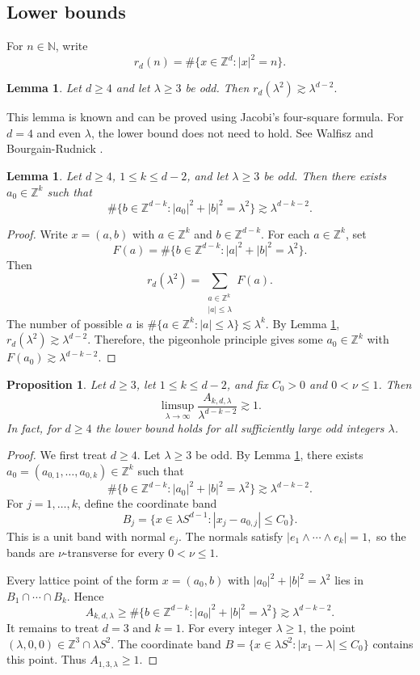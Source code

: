 \documentclass[11pt,reqno]{amsart}
\newtheorem{lemma}[theorem]{Lemma}
\newtheorem{proposition}[theorem]{Proposition}
\numberwithin{equation}{section}
\newcommand{\1}{\textbf{1}}
\newcommand{\ls}{\lesssim}
\newcommand{\gs}{\gtrsim}
\newcommand{\Z}{\mathbb Z}
\newcommand{\N}{\mathbb N}
\newcommand{\la}{\lambda}
\begin{document}
	
	\subsection{Lower bounds}
	For $n\in\N$, write
	\[
	r_d(n)=\#\{x\in\Z^d: |x|^2=n\}.
	\]
	\begin{lemma}\label{lem:rd-odd-lower}
		Let $d\ge4$ and let $\la \ge3$ be odd.  Then $r_d(\la^2)\gs \la^{d-2}.$ 
	\end{lemma}
	This lemma is known and can be proved using Jacobi's four-square formula. For $d=4$ and even $\la$, the lower bound does not need to hold. See Walfisz \cite{w} and Bourgain-Rudnick \cite[Section 2.1]{BR2011}.
	\begin{lemma}\label{lem:slice-pigeonhole}
		Let $d\ge4$, $1\le k\le d-2$, and let $\la\ge3$ be odd.  Then there exists $a_0\in\Z^k$ such that
		\[
		\#\{b\in\Z^{d-k}: |a_0|^2+|b|^2=\la^2\}
		\gs \la^{d-k-2}.
		\]
	\end{lemma}
	
	\begin{proof}
		Write $x=(a,b)$ with $a\in\Z^k$ and $b\in\Z^{d-k}$.  For each $a\in\Z^k$, set
		\[
		F(a)=\#\{b\in\Z^{d-k}: |a|^2+|b|^2=\la^2\}.
		\]
		Then
		\[
		r_d(\la^2)=\sum_{\substack{a\in\Z^k\\ |a|\le \la}}F(a).
		\]
		The number of possible $a$ is $\#\{a\in\Z^k: |a|\le \la\}
		\ls \la^k.$
		By Lemma \ref{lem:rd-odd-lower}, $r_d(\la^2)\gs \la^{d-2}.$
		Therefore, the pigeonhole principle gives some $a_0\in\Z^k$ with $F(a_0)
		\gs
		\la^{d-k-2}.$
	\end{proof}
	
	\begin{proposition}\label{thm:limsup}
		Let $d\ge3$, let $1\le k\le d-2$, and fix $C_0>0$ and $0<\nu\le1$.  Then
		\[
		\limsup_{\lambda\to\infty}
		\frac{A_{k,d,\lambda}}{\lambda^{d-k-2}}
		\gs1.
		\]
		In fact, for $d\ge4$ the lower bound holds for all sufficiently large odd integers $\lambda$.
	\end{proposition}
	
	\begin{proof}
		We first treat $d\ge4$.  Let $\la\ge3$ be odd.  By Lemma \ref{lem:slice-pigeonhole}, there exists $a_0=(a_{0,1},\dots,a_{0,k})\in\Z^k$ such that
		\[
		\#\{b\in\Z^{d-k}: |a_0|^2+|b|^2=\la^2\}
		\gs \la^{d-k-2}.
		\]
		For $j=1,\dots,k$, define the coordinate band
		\[
		B_j
		=
		\{x\in \la S^{d-1}: |x_j-a_{0,j}|\le C_0\}.
		\]
		This is a unit band with normal $e_j$.  The normals satisfy $|e_1\wedge\cdots\wedge e_k|=1,$
		so the bands are $\nu$-transverse for every $0<\nu\le1$.
		
		Every lattice point of the form $x=(a_0,b)$ with $|a_0|^2+|b|^2=\la^2$
		lies in $B_1\cap\cdots\cap B_k$. Hence
		\[
		A_{k,d,\la}
		\ge
		\#\{b\in\Z^{d-k}: |a_0|^2+|b|^2=\la^2\}
		\gs \la^{d-k-2}.
		\]
		It remains to treat $d=3$ and $k=1$.
		For every integer $\la\ge1$, the point $(\la,0,0)\in\Z^3\cap \la S^2.$
		The coordinate band $B=\bigl\{x\in \la S^2: |x_1-\la|\le C_0\bigr\}$
		contains this point.  Thus $A_{1,3,\la}\ge1.$
	\end{proof}
	
\end{document}
